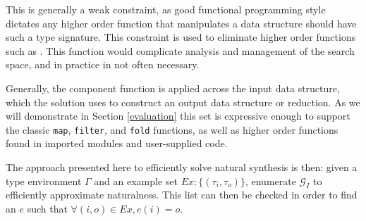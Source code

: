 This is generally a weak constraint, as good functional programming style dictates any higher order function that manipulates a data structure should have such a type signature.
This constraint is used to eliminate higher order functions such as .
This function would complicate analysis and management of the search space, and in practice in not often necessary.




Generally, the component function is applied across the \textsf{input} data structure, which the \textsf{solution} uses to construct an \textsf{output} data structure or reduction.
As we will demonstrate in Section \ref{evaluation} this set is expressive enough to support the classic \texttt{map}, \texttt{filter}, and \texttt{fold} functions, as well as higher order functions found in imported modules and user-supplied code.

The approach presented here to efficiently solve natural synthesis is then: given a type environment $\Gamma$ and an example set $Ex:\{(\tau_i,\tau_o)\}$, enumerate $\mathcal{G}_I$ to efficiently approximate naturalness.
This list can then be checked in order to find an $e$ such that $\forall (i,o) \in Ex, e (i) = o$.
